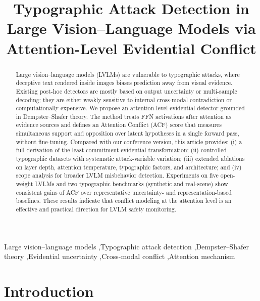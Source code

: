 \documentclass[preprint,12pt]{elsarticle}
\begin{document}
\begin{frontmatter}

\title{Typographic Attack Detection in Large Vision--Language Models via Attention-Level Evidential Conflict}


\begin{abstract}
Large vision--language models (LVLMs) are vulnerable to typographic attacks, where deceptive text rendered inside images biases prediction away from visual evidence. Existing post-hoc detectors are mostly based on output uncertainty or multi-sample decoding; they are either weakly sensitive to internal cross-modal contradiction or computationally expensive. We propose an attention-level evidential detector grounded in Dempster--Shafer theory. The method treats FFN activations after attention as evidence sources and defines an Attention Conflict (ACF) score that measures simultaneous support and opposition over latent hypotheses in a single forward pass, without fine-tuning. Compared with our conference version, this article provides: (i) a full derivation of the least-commitment evidential transformation; (ii) controlled typographic datasets with systematic attack-variable variation; (iii) extended ablations on layer depth, attention temperature, typographic factors, and architecture; and (iv) scope analysis for broader LVLM misbehavior detection. Experiments on five open-weight LVLMs and two typographic benchmarks (synthetic and real-scene) show consistent gains of ACF over representative uncertainty- and representation-based baselines. These results indicate that conflict modeling at the attention level is an effective and practical direction for LVLM safety monitoring.
\end{abstract}

\begin{keyword}
Large vision--language models \sep Typographic attack detection \sep Dempster--Shafer theory \sep Evidential uncertainty \sep Cross-modal conflict \sep Attention mechanism
\end{keyword}

\end{frontmatter}

\section{Introduction}
\end{document}
